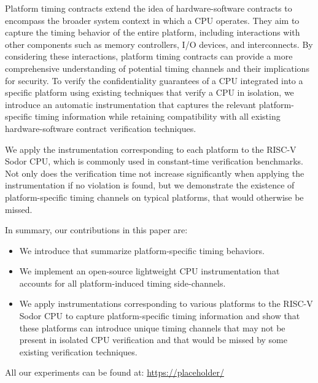 Platform timing contracts extend the idea of hardware-software contracts to encompass the broader system context in which a CPU operates.
They aim to capture the timing behavior of the entire platform, including interactions with other components such as memory controllers, I/O devices, and interconnects.
By considering these interactions, platform timing contracts can provide a more comprehensive understanding of potential timing channels and their implications for security.
To verify the confidentiality guarantees of a CPU integrated into a specific platform using existing techniques that verify a CPU in isolation, we introduce an automatic instrumentation that captures the relevant platform-specific timing information while retaining compatibility with all existing hardware-software contract verification techniques.

We apply the instrumentation corresponding to each platform to the RISC-V Sodor CPU, which is commonly used in constant-time verification benchmarks.
Not only does the verification time not increase significantly when applying the instrumentation if no violation is found, but we demonstrate the existence of platform-specific timing channels on typical platforms, that would otherwise be missed.

In summary, our contributions in this paper are:
\begin{itemize}
    \item We introduce \pics that summarize platform-specific timing behaviors.
    \item We implement an open-source lightweight CPU instrumentation that accounts for all platform-induced timing side-channels.
    \item We apply instrumentations corresponding to various platforms to the RISC-V Sodor CPU to capture platform-specific timing information and show that these platforms can introduce unique timing channels that may not be present in isolated CPU verification and that would be missed by some existing verification techniques.
\end{itemize}

\vspace*{0.5em}
All our experiments can be found at: \url{https://placeholder/} 
